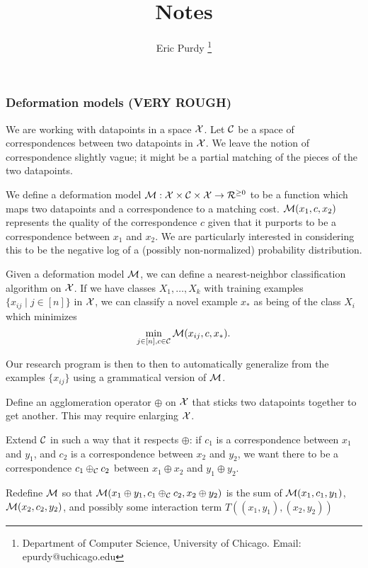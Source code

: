 \documentclass{article}
\title{Notes}
\author{Eric Purdy \footnote{Department of Computer Science, University of Chicago. Email: epurdy@uchicago.edu}}
\begin{document}
\maketitle


\subsubsection{Deformation models (VERY ROUGH)}

We are working with datapoints in a space ${\mathcal X}$. Let ${\mathcal C}$ be a
space of correspondences between two datapoints in ${\mathcal X}$.  We leave the
notion of correspondence slightly vague; it might be a partial
matching of the pieces of the two datapoints.

We define a deformation model ${\mathcal M}: {\mathcal X} \times {\mathcal C} \times {\mathcal X} \to
{\mathcal R}^{\ge 0}$ to be a function which maps two datapoints and a
correspondence to a matching cost. ${\mathcal M}(x_1, c, x_2)$ represents the
quality of the correspondence $c$ 
 given that it purports to be a
correspondence between $x_1$ and $x_2$. We are particularly interested
in considering this to be the negative log of a (possibly
non-normalized) probability distribution.

Given a deformation model ${\mathcal M}$, we can define a nearest-neighbor
classification algorithm on ${\mathcal X}$. If we have classes $X_1,\dots,X_k$ with
training examples $\{x_{ij} \mid j\in [n] \}$ in ${\mathcal X}$, we can classify a novel
example $x_*$ as being of the class $X_i$ which minimizes 
$$\min_{j\in [n], c\in {\mathcal C}} {\mathcal M}(x_{ij}, c, x_*).$$

Our research program is then to then to automatically generalize from the
examples $\{x_{ij}\}$ using a grammatical version of ${\mathcal M}$.


\bitem
\item Define an agglomeration operator $\oplus$ on ${\mathcal X}$ that sticks
  two datapoints together to get another. This may require enlarging
  ${\mathcal X}$.
\item Extend ${\mathcal C}$ in such a way that it respects $\oplus$: if $c_1$
  is a correspondence between $x_1$ and $y_1$, and $c_2$ is a
  correspondence between $x_2$ and $y_2$, we want there to be a
  correspondence $c_1 \oplus_{\mathcal C} c_2$ between $x_1\oplus x_2$ and
  $y_1\oplus y_2$.
\item Redefine ${\mathcal M}$ so that ${\mathcal M}( x_1\oplus y_1, c_1 \oplus_{\mathcal C}
  c_2, x_2\oplus y_2 )$ is the sum of ${\mathcal M}(x_1,c_1,y_1)$,
  ${\mathcal M}(x_2,c_2,y_2)$, and possibly some interaction term $T( (x_1,y_1), (x_2,y_2) )$
\end{document}

